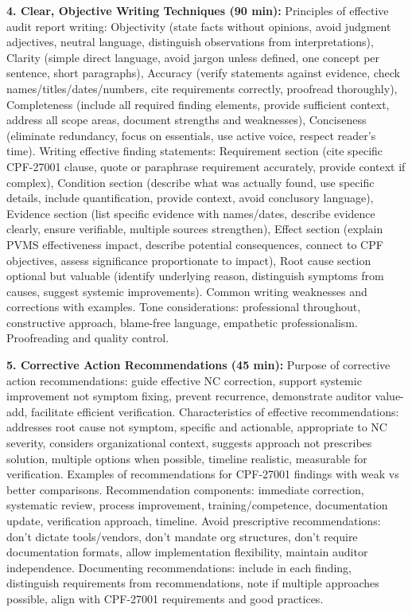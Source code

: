 \documentclass[11pt,a4paper]{article}
\begin{document}
\textbf{4. Clear, Objective Writing Techniques (90 min):} Principles of effective audit report writing: Objectivity (state facts without opinions, avoid judgment adjectives, neutral language, distinguish observations from interpretations), Clarity (simple direct language, avoid jargon unless defined, one concept per sentence, short paragraphs), Accuracy (verify statements against evidence, check names/titles/dates/numbers, cite requirements correctly, proofread thoroughly), Completeness (include all required finding elements, provide sufficient context, address all scope areas, document strengths and weaknesses), Conciseness (eliminate redundancy, focus on essentials, use active voice, respect reader's time). Writing effective finding statements: Requirement section (cite specific CPF-27001 clause, quote or paraphrase requirement accurately, provide context if complex), Condition section (describe what was actually found, use specific details, include quantification, provide context, avoid conclusory language), Evidence section (list specific evidence with names/dates, describe evidence clearly, ensure verifiable, multiple sources strengthen), Effect section (explain PVMS effectiveness impact, describe potential consequences, connect to CPF objectives, assess significance proportionate to impact), Root cause section optional but valuable (identify underlying reason, distinguish symptoms from causes, suggest systemic improvements). Common writing weaknesses and corrections with examples. Tone considerations: professional throughout, constructive approach, blame-free language, empathetic professionalism. Proofreading and quality control.

\textbf{5. Corrective Action Recommendations (45 min):} Purpose of corrective action recommendations: guide effective NC correction, support systemic improvement not symptom fixing, prevent recurrence, demonstrate auditor value-add, facilitate efficient verification. Characteristics of effective recommendations: addresses root cause not symptom, specific and actionable, appropriate to NC severity, considers organizational context, suggests approach not prescribes solution, multiple options when possible, timeline realistic, measurable for verification. Examples of recommendations for CPF-27001 findings with weak vs better comparisons. Recommendation components: immediate correction, systematic review, process improvement, training/competence, documentation update, verification approach, timeline. Avoid prescriptive recommendations: don't dictate tools/vendors, don't mandate org structures, don't require documentation formats, allow implementation flexibility, maintain auditor independence. Documenting recommendations: include in each finding, distinguish requirements from recommendations, note if multiple approaches possible, align with CPF-27001 requirements and good practices.
\end{document}
